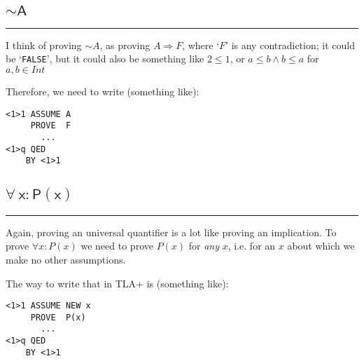 \documentclass{article}
\newcommand{\code}[1]{\mathsf{#1}}
\begin{document}
\subsection{$\code{\sim A}$}
\hrule
\vspace{10pt}
\begin{minipage}{230pt}
I think of proving $\sim A$, as proving $A \Rightarrow F$, where `$F$' 
is any contradiction; it could be `\verb|FALSE|', but it could also be 
something like $2 \leq 1$, or $a \le b \wedge b \le a$ for $a, b \in Int$ \\

\vspace{5pt}

Therefore, we need to write (something like):
\end{minipage}
%
\hspace{15pt} \vline \hspace{15pt}
%
\begin{minipage}{80pt}
\begin{verbatim}
<1>1 ASSUME A
     PROVE  F 
       ...
<1>q QED
    BY <1>1
\end{verbatim}
\vspace{5pt}
\end{minipage}



\subsection{$\code{\forall\ x : P(x)}$}
\hrule
\vspace{10pt}
\begin{minipage}{230pt}
Again, proving an universal quantifier is a lot like proving an
implication. To prove $\forall x : P(x)$ we need to prove
$P(x)$ for \emph{any} $x$, i.e. for an $x$ about which we
make no other assumptions.\\

\vspace{5pt}

The way to write that in TLA+ is (something like):
\end{minipage}
%
\hspace{15pt} \vline \hspace{15pt}
%
\begin{minipage}{80pt}
\begin{verbatim}
<1>1 ASSUME NEW x
     PROVE  P(x)
       ...
<1>q QED
    BY <1>1
\end{verbatim}
\end{minipage}
\end{document}
